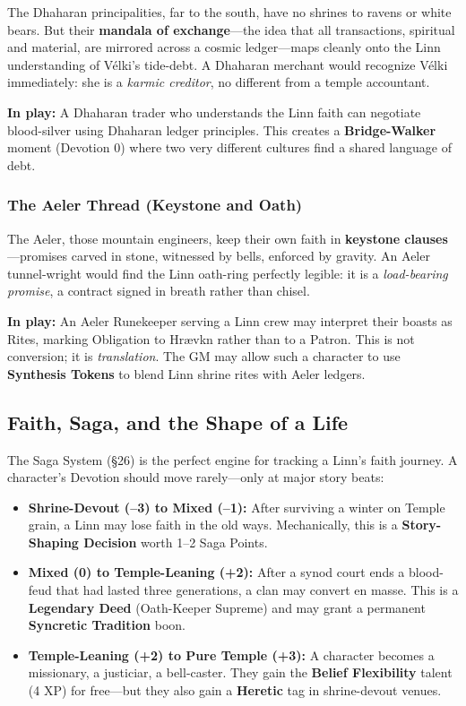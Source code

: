 \documentclass[11pt]{article}
\begin{document}
The Dhaharan principalities, far to the south, have no shrines to ravens or white bears. But their \textbf{mandala of exchange}---the idea that all transactions, spiritual and material, are mirrored across a cosmic ledger---maps cleanly onto the Linn understanding of Vélki's tide-debt. A Dhaharan merchant would recognize Vélki immediately: she is a \textit{karmic creditor}, no different from a temple accountant.

\textbf{In play:} A Dhaharan trader who understands the Linn faith can negotiate blood-silver using Dhaharan ledger principles. This creates a \textbf{Bridge-Walker} moment (Devotion 0) where two very different cultures find a shared language of debt.

\subsubsection{The Aeler Thread (Keystone and Oath)}

The Aeler, those mountain engineers, keep their own faith in \textbf{keystone clauses}---promises carved in stone, witnessed by bells, enforced by gravity. An Aeler tunnel-wright would find the Linn oath-ring perfectly legible: it is a \textit{load-bearing promise}, a contract signed in breath rather than chisel.

\textbf{In play:} An Aeler Runekeeper serving a Linn crew may interpret their boasts as Rites, marking Obligation to Hrævkn rather than to a Patron. This is not conversion; it is \textit{translation}. The GM may allow such a character to use \textbf{Synthesis Tokens} to blend Linn shrine rites with Aeler ledgers.

\subsection{Faith, Saga, and the Shape of a Life}

The Saga System (§26) is the perfect engine for tracking a Linn's faith journey. A character's Devotion should move rarely---only at major story beats:

\begin{itemize}
\item \textbf{Shrine-Devout (--3) to Mixed (--1):} After surviving a winter on Temple grain, a Linn may lose faith in the old ways. Mechanically, this is a \textbf{Story-Shaping Decision} worth 1--2 Saga Points.
\item \textbf{Mixed (0) to Temple-Leaning (+2):} After a synod court ends a blood-feud that had lasted three generations, a clan may convert en masse. This is a \textbf{Legendary Deed} (Oath-Keeper Supreme) and may grant a permanent \textbf{Syncretic Tradition} boon.
\item \textbf{Temple-Leaning (+2) to Pure Temple (+3):} A character becomes a missionary, a justiciar, a bell-caster. They gain the \textbf{Belief Flexibility} talent (4 XP) for free---but they also gain a \textbf{Heretic} tag in shrine-devout venues.
\end{itemize}
\end{document}
